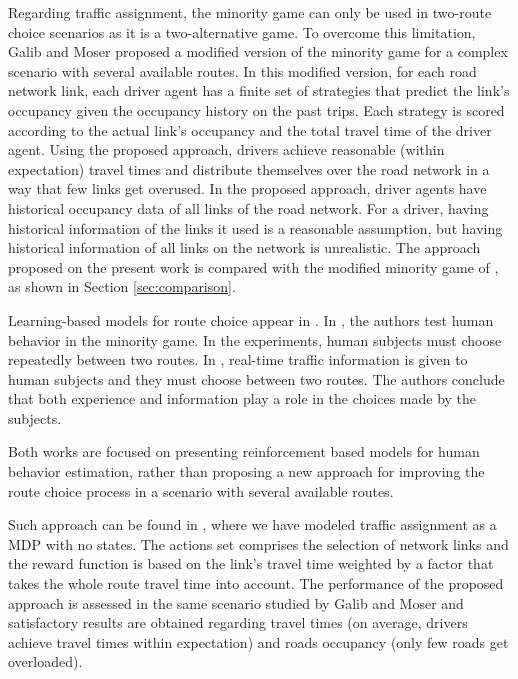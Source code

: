 \documentclass{RITA}
\begin{document}
Regarding traffic assignment, the minority game can only be used in two-route choice scenarios as it is a two-alternative game. To overcome this limitation, Galib and Moser \cite{Galib&Moser2011} proposed a modified version of the minority game for a complex scenario with several available routes. In this modified version, for each road network link, each driver agent has a finite set of strategies that predict the link's occupancy given the occupancy history on the past trips. Each strategy is scored according to the actual link's occupancy and the total travel time of the driver agent. Using the proposed approach, drivers achieve reasonable (within expectation) travel times and distribute themselves over the road network in a way that few links get overused. In the proposed approach, driver agents have historical occupancy data of all links of the road network. For a driver, having historical information of the links it used is a reasonable assumption, but having historical information of all links on the network is unrealistic. The approach proposed on the present work is compared with the modified minority game of \cite{Galib&Moser2011}, as shown in Section \ref{sec:comparison}. 


Learning-based models for route choice appear in \cite{Chmura&Pitz2007,Ben-Elia&Shiftan2010}. In \cite{Chmura&Pitz2007}, the authors test human behavior in the minority game. In the experiments, human subjects must choose repeatedly between two routes. In \cite{Ben-Elia&Shiftan2010}, real-time traffic information is given to human subjects and they must choose between two routes. The authors conclude that both experience and information play a role in the choices made by the subjects.

Both works are focused on presenting reinforcement based models for human behavior estimation, rather than proposing a new approach for improving the route choice process in a scenario with several available routes. 

Such approach can be found in \cite{Tavares&Bazzan2012}, where we have modeled traffic assignment as a MDP with no states. The actions set comprises the selection of network links and the reward function is based on the link's travel time weighted by a factor that takes the whole route travel time into account. The performance of the proposed approach is assessed in the same scenario studied by Galib and Moser \cite{Galib&Moser2011} and satisfactory results are obtained regarding travel times (on average, drivers achieve travel times within expectation) and roads occupancy (only few roads get overloaded). 
\end{document}
